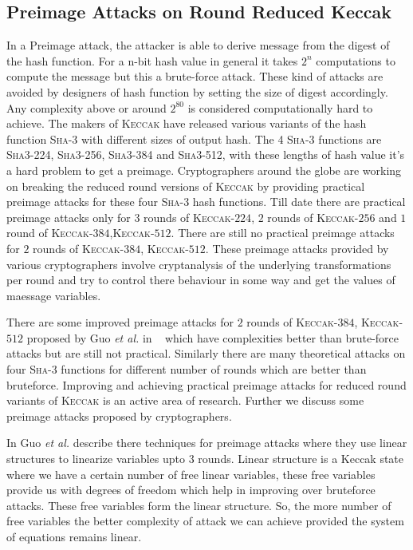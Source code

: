 \documentclass[runningheads]{llncs}
\newcommand{\KECCAK}{\mbox{\textsc{Keccak}}}
\newcommand{\SHA}{\textsc{Sha}}
\newcommand{\etal}{\textit{et al. }}
\begin{document}
\subsection{Preimage Attacks on Round Reduced Keccak}

In a Preimage attack, the attacker is able to derive message from the digest of the hash function. For a n-bit hash value in general it takes $2^{n}$ computations to compute the message but this a brute-force attack. These kind of attacks are avoided by designers of hash function by setting the size of digest accordingly. Any complexity above or around $2^{80}$ is considered computationally hard to achieve. The makers of \KECCAK{} have released various variants of the hash function \SHA-3 with different sizes of output hash. The 4 \SHA-3 functions are \SHA3-224, \SHA3-256, \SHA3-384 and \SHA3-512, with these lengths of hash value it's a hard problem to get a preimage. Cryptographers around the globe are working on breaking the reduced round versions of \KECCAK{} by providing practical preimage attacks for these four \SHA-3 hash functions. Till date there are practical preimage attacks only for $3$ rounds of \KECCAK-$224$, $2$ rounds of \KECCAK-$256$ and $1$ round of \KECCAK-$384$,\KECCAK-$512$. There are still no practical preimage attacks for $2$ rounds of \KECCAK-$384$, \KECCAK-$512$. These preimage attacks provided by various cryptographers involve cryptanalysis of the underlying transformations per round and try to control there behaviour in some way and get the values of maessage variables.

There are some improved preimage attacks for $2$ rounds of \KECCAK-$384$, \KECCAK-$512$ proposed by Guo \etal in ~\cite{guo2016linear} which have complexities better than brute-force attacks but are still not practical. Similarly there are many theoretical attacks on four \SHA-3 functions for different number of rounds which are better than bruteforce. Improving and achieving practical preimage attacks for reduced round variants of \KECCAK{} is an active area of research. Further we discuss some preimage attacks proposed by cryptographers.

In \cite{guo2016linear} Guo \etal describe there techniques for preimage attacks where they use linear structures to linearize variables upto 3 rounds. Linear structure is a Keccak state where we have a certain number of free linear variables, these free variables provide us with degrees of freedom which help in improving over bruteforce attacks. These free variables form the linear structure. So, the more number of free variables the better complexity of attack we can achieve provided the system of equations remains linear.
\end{document}
